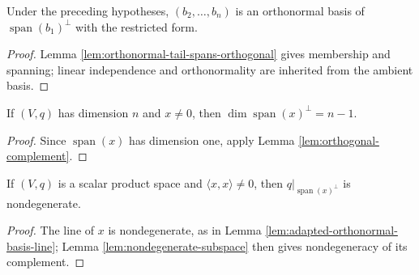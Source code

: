 \begin{lemma}
\label{lem:orthonormal-basis-orthogonal-complement}
\leanok
{}
Under the preceding hypotheses, $(b_2,\ldots,b_n)$ is an orthonormal basis of $\operatorname{span}(b_1)^\perp$ with the restricted form.
\end{lemma}
\begin{proof}
\leanok
{}
\sketch Lemma \ref{lem:orthonormal-tail-spans-orthogonal} gives membership and spanning; linear independence and orthonormality are inherited from the ambient basis.
\end{proof}

\begin{lemma}
\label{lem:orthogonal-complement-non-null-line-hyperplane}
\leanok
{}
If $(V,q)$ has dimension $n$ and $x\ne0$, then $\dim\operatorname{span}(x)^\perp=n-1$.
\end{lemma}
\begin{proof}
\leanok
{}
\sketch Since $\operatorname{span}(x)$ has dimension one, apply Lemma \ref{lem:orthogonal-complement}.
\end{proof}

\begin{lemma}
\label{lem:orthogonal-complement-non-null-line-nondegenerate}
\leanok
{}
If $(V,q)$ is a scalar product space and $\langle x,x\rangle\ne0$, then $q|_{\operatorname{span}(x)^\perp}$ is nondegenerate.
\end{lemma}
\begin{proof}
\leanok
{}
\sketch The line of $x$ is nondegenerate, as in Lemma \ref{lem:adapted-orthonormal-basis-line}; Lemma \ref{lem:nondegenerate-subspace} then gives nondegeneracy of its complement.
\end{proof}

